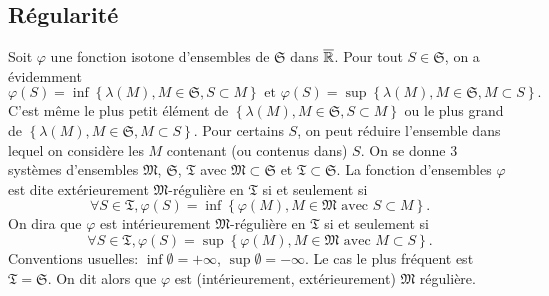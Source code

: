 \subsection{Régularité} \label{SubSec:Regularite}
\noindent Soit $\varphi$ une fonction isotone d'ensembles de $\mathfrak{S}$ dans $\overline{\mathbb{R}}$.
Pour tout $S \in \mathfrak{S}$, on a évidemment
\begin{displaymath}
 \varphi(S) = \inf\left\lbrace \lambda(M), M \in \mathfrak{S}, S \subset M\right\rbrace \text{ et }
 \varphi(S) = \sup\left\lbrace \lambda(M), M \in \mathfrak{S}, M \subset S\right\rbrace.
\end{displaymath}
C'est même le plus petit élément de $\left\lbrace \lambda(M), M \in \mathfrak{S}, S \subset M\right\rbrace$ ou le plus grand de $\left\lbrace \lambda(M), M \in \mathfrak{S}, M \subset S \right\rbrace$. Pour certains $S$, on peut réduire l'ensemble dans lequel on considère les $M$ contenant (ou contenus dans) $S$.\newline
On se donne 3 systèmes d'ensembles $\mathfrak{M}$, $\mathfrak{S}$, $\mathfrak{T}$ avec $\mathfrak{M} \subset \mathfrak{S}$ et $\mathfrak{T} \subset \mathfrak{S}$. La fonction d'ensembles $\varphi$ est dite extérieurement $\mathfrak{M}$-régulière en $\mathfrak{T}$ si et seulement si
\begin{displaymath}
 \forall S \in \mathfrak{T}, \varphi(S) = \inf\left\lbrace \varphi(M), M \in \mathfrak{M} \text{ avec } S \subset M\right\rbrace.
\end{displaymath}
On dira que $\varphi$ est intérieurement $\mathfrak{M}$-régulière en $\mathfrak{T}$ si et seulement si
\begin{displaymath}
 \forall S \in \mathfrak{T}, \varphi(S) = \sup\left\lbrace \varphi(M), M \in \mathfrak{M} \text{ avec } M \subset S\right\rbrace.
\end{displaymath}
Conventions usuelles: $\inf \emptyset = + \infty$, $\sup \emptyset = - \infty$.\newline
Le cas le plus fréquent est $\mathfrak{T} = \mathfrak{S}$. On dit alors que $\varphi$ est (intérieurement, extérieurement) $\mathfrak{M}$ régulière.

